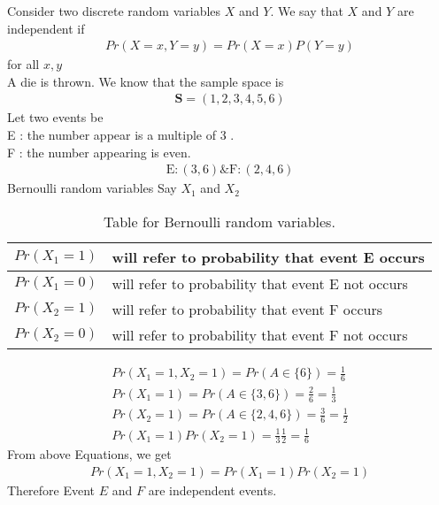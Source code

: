 Consider two discrete random variables $X$ and $Y$. We say that $X$ and $Y$ are independent if
\begin{align}
Pr(X=x, Y=y)= Pr(X=x)P(Y=y) 
\end{align}
for all $x, y$\\
A die is thrown.
We know that the sample space is
\begin{align}
\mathbf{S} = (1,2,3,4,5,6)
\end{align}
Let two events be\\
E : the number appear is a multiple of 3 .\\
F : the number appearing is even.
\begin{align}
\mathrm{E}:(3,6) \& \mathrm{F}:(2,4,6)
\end{align}
Bernoulli random variables Say $X_1$ and $X_2$
\begin{table}[h]
\begin{tabular}{ | m{2cm} | m{15em}| } 
\hline
$Pr(X_1=1)$& will refer to probability that event E occurs\\ 
\hline
 $Pr(X_1=0)$&  will refer to probability that event E not occurs \\ 
\hline
$Pr(X_2=1)$ &  will refer to probability that event F occurs \\ 
\hline
$Pr(X_2=0)$ &  will refer to probability that event F not occurs  \\ 
\hline
\end{tabular}
\caption{Table for Bernoulli random variables.}
\label{tab:truthTables}   
\end{table}
\begin{align}
Pr(X_1=1,X_2=1) = Pr(A\in\{6\}) = \frac{1}{6}\\
Pr(X_1=1) = Pr(A\in\{3,6\}) = \frac{2}{6} = \frac{1}{3}\\
Pr(X_2=1) = Pr(A\in\{2,4,6\}) = \frac{3}{6} = \frac{1}{2}\\
Pr(X_1=1)Pr(X_2=1) = \frac{1}{3}\frac{1}{2} = \frac{1}{6}
\end{align}
From above Equations, we get
\begin{align}
Pr(X_1=1, X_2=1) = Pr(X_1=1)Pr(X_2=1)
\end{align}
Therefore Event $E$ and $F$ are independent events.